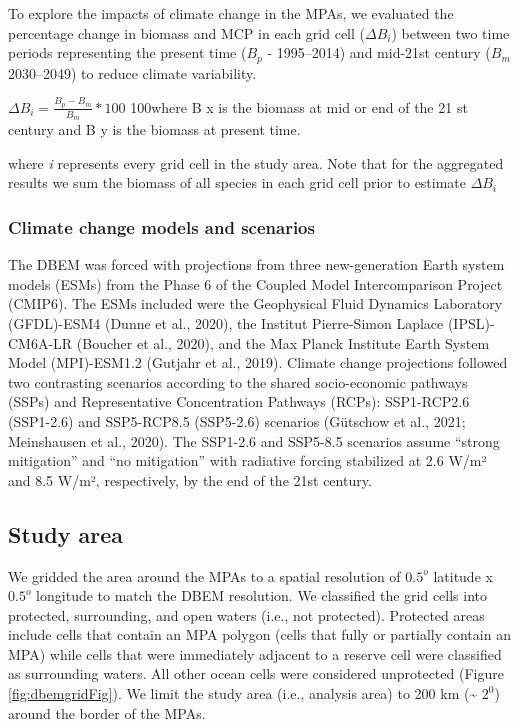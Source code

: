 \documentclass[
]{article}
\begin{document}
To explore the impacts of climate change in the MPAs, we evaluated the percentage change in biomass and MCP in each grid cell (\(ΔB_i\)) between two time periods representing the present time (\(B_p\) - 1995--2014) and mid-21st century (\(B_m\) 2030--2049) to reduce climate variability.

\(ΔB_i = \frac{B_p − B_m}{B_m}*100\) 100where B x is the biomass at mid or end of the 21 st century and B y is the biomass at present time.

where \emph{i} represents every grid cell in the study area. Note that for the aggregated results we sum the biomass of all species in each grid cell prior to estimate \(ΔB_i\)

\hypertarget{climate-change-models-and-scenarios}{%
\subsubsection{Climate change models and scenarios}\label{climate-change-models-and-scenarios}}

The DBEM was forced with projections from three new-generation Earth system models (ESMs) from the Phase 6 of the Coupled Model Intercomparison Project (CMIP6). The ESMs included were the Geophysical Fluid Dynamics Laboratory (GFDL)-ESM4 (Dunne et al., 2020), the Institut Pierre-Simon Laplace (IPSL)-CM6A-LR (Boucher et al., 2020), and the Max Planck Institute Earth System Model (MPI)-ESM1.2 (Gutjahr et al., 2019). Climate change projections followed two contrasting scenarios according to the shared socio-economic pathways (SSPs) and Representative Concentration Pathways (RCPs): SSP1-RCP2.6 (SSP1-2.6) and SSP5-RCP8.5 (SSP5-2.6) scenarios (Gütschow et al., 2021; Meinshausen et al., 2020). The SSP1-2.6 and SSP5-8.5 scenarios assume ``strong mitigation'' and ``no mitigation'' with radiative forcing stabilized at 2.6 W/m² and 8.5 W/m², respectively, by the end of the 21st century.

\hypertarget{study-area}{%
\subsection{Study area}\label{study-area}}

We gridded the area around the MPAs to a spatial resolution of \(0.5^o\) latitude x \(0.5^o\) longitude to match the DBEM resolution. We classified the grid cells into protected, surrounding, and open waters (i.e., not protected). Protected areas include cells that contain an MPA polygon (cells that fully or partially contain an MPA) while cells that were immediately adjacent to a reserve cell were classified as surrounding waters. All other ocean cells were considered unprotected (Figure \ref{fig:dbemgridFig}). We limit the study area (i.e., analysis area) to 200 km (\textasciitilde{} \(2^0\)) around the border of the MPAs.
\end{document}
